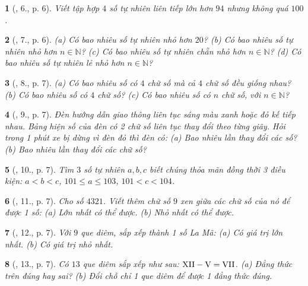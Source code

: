 \documentclass{article}
\newtheorem{baitoan}{}
\begin{document}
\begin{baitoan}[\cite{Tuyen_Toan_6}, 6., p. 6]
	Viết tập hợp $4$ số tự nhiên liên tiếp lớn hơn $94$ nhưng không quá $100$.
\end{baitoan}

\begin{baitoan}[\cite{Tuyen_Toan_6}, 7., p. 6]
	(a) Có bao nhiêu số tự nhiên nhỏ hơn $20$? (b) Có bao nhiêu số tự nhiên nhỏ hơn $n\in\mathbb{N}$? (c) Có bao nhiêu số tự nhiên chẵn nhỏ hơn $n\in\mathbb{N}$? (d) Có bao nhiêu số tự nhiên lẻ nhỏ hơn $n\in\mathbb{N}$?
\end{baitoan}

\begin{baitoan}[\cite{Tuyen_Toan_6}, 8., p. 7]
	(a) Có bao nhiêu số có $4$ chữ số mà cả $4$ chữ số đều giống nhau? (b) Có bao nhiêu số có $4$ chữ số? (c) Có bao nhiêu số có $n$ chữ số, với $n\in\mathbb{N}$?
\end{baitoan}

\begin{baitoan}[\cite{Tuyen_Toan_6}, 9., p. 7]
	Đèn hướng dẫn giao thông liên tục sáng màu xanh hoặc đỏ kế tiếp nhau. Bảng hiện số của đèn có 2 chữ số liên tục thay đổi theo từng giây. Hỏi trong 1 phút xe bị dừng vì đèn đỏ thì đèn có: (a) Bao nhiêu lần thay đổi các số? (b) Bao nhiêu lần thay đổi các chữ số?
\end{baitoan}

\begin{baitoan}[\cite{Tuyen_Toan_6}, 10., p. 7]
	Tìm $3$ số tự nhiên $a,b,c$ biết chúng thỏa mãn đồng thời 3 điều kiện: $a < b < c$, $101\le a\le103$, $101 < c < 104$.
\end{baitoan}

\begin{baitoan}[\cite{Tuyen_Toan_6}, 11., p. 7]
	Cho số $4321$. Viết thêm chữ số $9$ xen giữa các chữ số của nó để được 1 số: (a) Lớn nhất có thể được. (b) Nhỏ nhất có thể được.
\end{baitoan}

\begin{baitoan}[\cite{Tuyen_Toan_6}, 12., p. 7]
	Với $9$ que diêm, sắp xếp thành 1 số La Mã: (a) Có giá trị lớn nhất. (b) Có giá trị nhỏ nhất.
\end{baitoan}

\begin{baitoan}[\cite{Tuyen_Toan_6}, 13., p. 7]
	Có $13$ que diêm sắp xếp như sau: $\rm XII - V = VII$. (a) Đẳng thức trên đúng hay sai? (b) Đổi chỗ chỉ 1 que diêm để được 1 đẳng thức đúng.
\end{baitoan}
\end{document}
